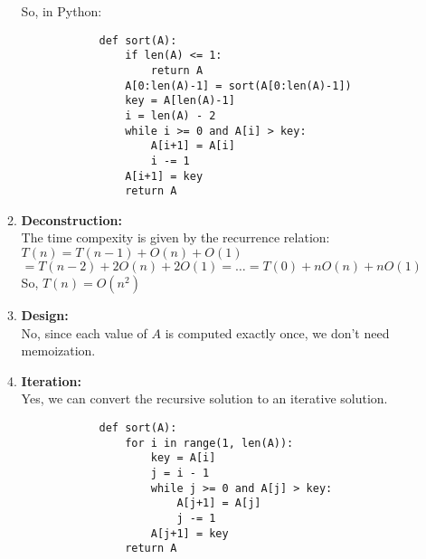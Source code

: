 \documentclass[a4paper]{article}
\begin{document}
\begin{enumerate}
\begin{enumerate}
        So, in Python:
        \lstset{language=Python}
        \begin{lstlisting}
            def sort(A):
                if len(A) <= 1:
                    return A
                A[0:len(A)-1] = sort(A[0:len(A)-1])
                key = A[len(A)-1]
                i = len(A) - 2
                while i >= 0 and A[i] > key:
                    A[i+1] = A[i]
                    i -= 1
                A[i+1] = key
                return A
        \end{lstlisting}

        \item \textbf{Deconstruction:} \\
        The time compexity is given by the recurrence relation: $T(n) = T(n-1) + O(n) + O(1)$ \\
        $ = T(n-2) + 2O(n) + 2O(1) = \dots = T(0) + nO(n) + nO(1)$ \\
        So, $T(n) = O(n^2)$ \\

        \item \textbf{Design:} \\
        No, since each value of $A$ is computed exactly once, we don't need memoization. \\

        \item \textbf{Iteration:} \\
        Yes, we can convert the recursive solution to an iterative solution.
        \lstset{language=Python}
        \begin{lstlisting}
            def sort(A):
                for i in range(1, len(A)):
                    key = A[i]
                    j = i - 1
                    while j >= 0 and A[j] > key:
                        A[j+1] = A[j]
                        j -= 1
                    A[j+1] = key
                return A
        \end{lstlisting}


\end{enumerate}
\end{enumerate}
\end{document}

